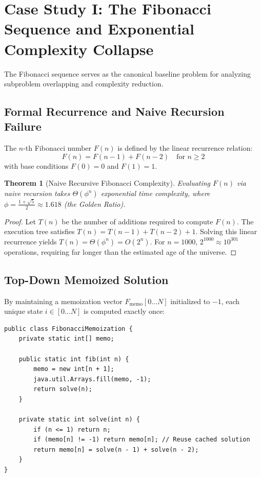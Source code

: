 \documentclass[10pt,journal,compsoc,onecolumn]{IEEEtran}
\newtheorem{theorem}{Theorem}
\begin{document}
\section{Case Study I: The Fibonacci Sequence and Exponential Complexity Collapse}
\label{sec:fibonacci}

The Fibonacci sequence serves as the canonical baseline problem for analyzing subproblem overlapping and complexity reduction.

\subsection{Formal Recurrence and Naive Recursion Failure}

The $n$-th Fibonacci number $F(n)$ is defined by the linear recurrence relation:
\[
F(n) = F(n-1) + F(n-2) \quad \text{for } n \ge 2
\]
with base conditions $F(0) = 0$ and $F(1) = 1$.

\begin{theorem}[Naive Recursive Fibonacci Complexity]
Evaluating $F(n)$ via naive recursion takes $\Theta(\phi^n)$ exponential time complexity, where $\phi = \frac{1+\sqrt{5}}{2} \approx 1.618$ (the Golden Ratio).
\end{theorem}

\begin{proof}
Let $T(n)$ be the number of additions required to compute $F(n)$. The execution tree satisfies $T(n) = T(n-1) + T(n-2) + 1$. Solving this linear recurrence yields $T(n) = \Theta(\phi^n) = O(2^n)$. For $n = 1000$, $2^{1000} \approx 10^{301}$ operations, requiring far longer than the estimated age of the universe.
\end{proof}

\subsection{Top-Down Memoized Solution}

By maintaining a memoization vector $F_{\text{memo}}[0 \dots N]$ initialized to $-1$, each unique state $i \in [0 \dots N]$ is computed exactly once:

\begin{verbatim}
public class FibonacciMemoization {
    private static int[] memo;

    public static int fib(int n) {
        memo = new int[n + 1];
        java.util.Arrays.fill(memo, -1);
        return solve(n);
    }

    private static int solve(int n) {
        if (n <= 1) return n;
        if (memo[n] != -1) return memo[n]; // Reuse cached solution
        return memo[n] = solve(n - 1) + solve(n - 2);
    }
}
\end{verbatim}
\end{document}
